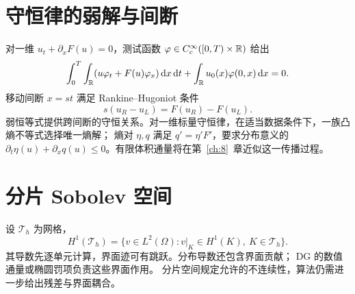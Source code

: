 \section{守恒律的弱解与间断}
对一维 $u_t+\partial_xF(u)=0$，测试函数
$\varphi\in C_c^\infty([0,T)\times\mathbb R)$ 给出
\[
\int_0^T\int_\mathbb R(u\varphi_t+F(u)\varphi_x)\,\mathrm d x\,\mathrm d t
+\int_\mathbb R u_0(x)\varphi(0,x)\,\mathrm d x=0.
\]
移动间断 $x=s t$ 满足 Rankine--Hugoniot 条件
\[
s(u_R-u_L)=F(u_R)-F(u_L).
\]
弱恒等式提供跨间断的守恒关系。对一维标量守恒律，在适当数据条件下，一族凸熵不等式选择唯一熵解；
熵对 $\eta,q$ 满足 $q'=\eta'F'$，要求分布意义的
$\partial_t\eta(u)+\partial_xq(u)\le0$。有限体积通量将在第~\ref{ch:8}~章近似这一传播过程。

\section{分片 Sobolev 空间}
设 $\mathcal T_h$ 为网格，
\[
H^1(\mathcal T_h)=\{v\in L^2(\Omega):v|_K\in H^1(K),\ K\in\mathcal T_h\}.
\]
其导数先逐单元计算，界面迹可有跳跃。分布导数还包含界面贡献；
DG 的数值通量或椭圆罚项负责这些界面作用。
分片空间规定允许的不连续性，算法仍需进一步给出残差与界面耦合。
